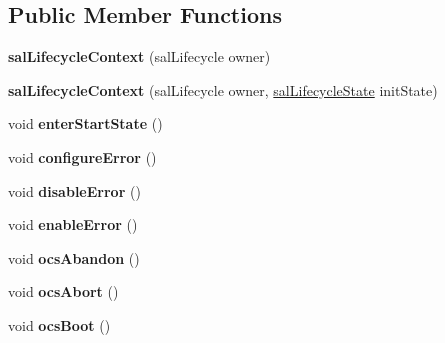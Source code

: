 \subsection*{Public Member Functions}
\begin{DoxyCompactItemize}
\item 
\hypertarget{classsal_lifecycle_context_a0bf4c186610c050a53427ae2ef5d3ffb}{{\bfseries sal\-Lifecycle\-Context} (sal\-Lifecycle owner)}\label{classsal_lifecycle_context_a0bf4c186610c050a53427ae2ef5d3ffb}

\item 
\hypertarget{classsal_lifecycle_context_a7f84069ab0d79e2cd81f7990a329b1e6}{{\bfseries sal\-Lifecycle\-Context} (sal\-Lifecycle owner, \hyperlink{classsal_lifecycle_state}{sal\-Lifecycle\-State} init\-State)}\label{classsal_lifecycle_context_a7f84069ab0d79e2cd81f7990a329b1e6}

\item 
\hypertarget{classsal_lifecycle_context_a8e57d270e6741d105a52a4f2508ea884}{void {\bfseries enter\-Start\-State} ()}\label{classsal_lifecycle_context_a8e57d270e6741d105a52a4f2508ea884}

\item 
\hypertarget{classsal_lifecycle_context_ac136c14aef8923874e83596679ca5221}{void {\bfseries configure\-Error} ()}\label{classsal_lifecycle_context_ac136c14aef8923874e83596679ca5221}

\item 
\hypertarget{classsal_lifecycle_context_a610552ef7ed4a54fd4707c75ae7cb338}{void {\bfseries disable\-Error} ()}\label{classsal_lifecycle_context_a610552ef7ed4a54fd4707c75ae7cb338}

\item 
\hypertarget{classsal_lifecycle_context_acea6cc163e624c7abe7e5b6b894416bd}{void {\bfseries enable\-Error} ()}\label{classsal_lifecycle_context_acea6cc163e624c7abe7e5b6b894416bd}

\item 
\hypertarget{classsal_lifecycle_context_a49d10bc8f396d4844fc13b7416f43a6e}{void {\bfseries ocs\-Abandon} ()}\label{classsal_lifecycle_context_a49d10bc8f396d4844fc13b7416f43a6e}

\item 
\hypertarget{classsal_lifecycle_context_a476935dbecb6ee4f238341464785dcea}{void {\bfseries ocs\-Abort} ()}\label{classsal_lifecycle_context_a476935dbecb6ee4f238341464785dcea}

\item 
\hypertarget{classsal_lifecycle_context_ab8f06491f6e375e6f9a0aa0f15853a5a}{void {\bfseries ocs\-Boot} ()}\label{classsal_lifecycle_context_ab8f06491f6e375e6f9a0aa0f15853a5a}


\end{DoxyCompactItemize}
